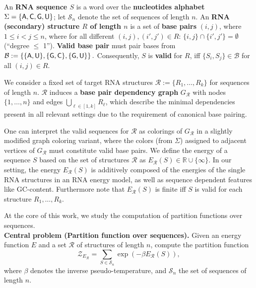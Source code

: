 \documentclass{bioinfo}
\newcommand{\partfun}[1]{\mathcal{Z}_{#1}}
\newcommand{\B}{\mathcal{B}}
\newcommand{\R}{\mathcal{R}}
\renewcommand{\S}{\mathcal{S}}
\newcommand{\Def}[1]{{\bfseries #1}}
\newcommand{\Nuc}[1]{{\sf #1}}
\newcommand{\Ab}{\Nuc{A}}
\newcommand{\Cb}{\Nuc{C}}
\newcommand{\Gb}{\Nuc{G}}
\newcommand{\Ub}{\Nuc{U}}
\newcommand{\GCb}{\Gb\Cb}
\begin{document}
An \Def{RNA sequence $S$} is a word over the \Def{nucleotides
  alphabet} $\Sigma=\{\Ab,\Cb,\Gb,\Ub\}$; let $\S_n$ denote the set of
sequences of length $n$. An \Def{RNA (secondary) structure $R$ of
  length $n$} is a set of \Def{base pairs} $(i,j)$, where
$1\leq i<j\leq n$, where for all different $(i,j), (i',j')\in R$:
$\{i,j\}\cap\{i',j'\}=\emptyset$ (``degree $\leq$ 1'').
% 
% 
\Def{Valid base pair} must pair bases from 
$\B:=\left\{\{\Ab,\Ub\},\{\Gb,\Cb\},\{\Gb,\Ub\}\right\}.$
Consequently, $S$ is \Def{valid} for $R$, iff $\{S_i,S_j\}\in \B$ for
all $(i,j)\in R$.

We consider a fixed set of target RNA structures
$\R:=\{R_1, \dots, R_k\}$ for sequences of length $n$. $\R$ induces a
\Def{base pair dependency graph} $G_{\R}$ with nodes $\{1,\dots,n\}$
and edges $\bigcup_{\ell\in[1,k]} R_\ell$, which describe the minimal
dependencies present in all relevant settings due to the requirement
of canonical base pairing.

One can interpret the valid sequences for $\R$ as colorings of
$G_{\R}$ in a slightly modified graph coloring variant, where the
colors (from $\Sigma$) assigned to adjacent vertices of $G_{\R}$ must
constitute valid base pairs.
%
We define the energy of a sequence $S$ based on the set of structures
$\R$ as $E_\R(S) \in \mathbb{R}\cup\{\infty\}$. In
our setting, the energy $E_\R(S)$ is additively composed of
the energies of the single RNA structures in an RNA energy model, as
well as sequence dependent features like \GCb-content.  Furthermore note
that $E_\R(S)$ is finite iff $S$ is valid for each structure
$R_1,\dots,R_k$.

At the core of this work, we study the computation of partition
functions over sequences.\smallskip\\
\textbf{Central problem (Partition function over sequences).}
  Given an energy function $E$ and a set $\R$ of structures of length $n$, compute the
  partition function
  \begin{equation}
    \label{eq:mainproblem}
    \partfun{E_\R} = \sum_{S\in\S_n} \exp(-\beta E_\R(S)),
  \end{equation}
  where $\beta$ denotes the inverse pseudo-temperature, and $\S_n$ the set of sequences of length $n$.
\end{document}
